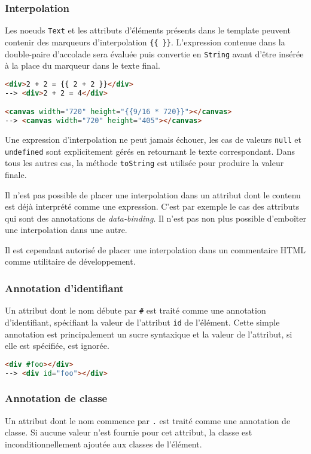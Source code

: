 \subsubsection{Interpolation}
Les noeuds \texttt{Text} et les attributs d'éléments présents dans le template peuvent contenir des marqueurs d'interpolation \texttt{\{\{ \}\}}. L'expression contenue dans la double-paire d'accolade sera évaluée puis convertie en \texttt{String} avant d'être insérée à la place du marqueur dans le texte final.

\begin{lstlisting}[language=HTML]
<div>2 + 2 = {{ 2 + 2 }}</div>
--> <div>2 + 2 = 4</div>

<canvas width="720" height="{{9/16 * 720}}"></canvas>
--> <canvas width="720" height="405"></canvas>
\end{lstlisting}

Une expression d'interpolation ne peut jamais échouer, les cas de valeurs \texttt{null} et \texttt{undefined} sont explicitement gérés en retournant le texte correspondant. Dans tous les autres cas, la méthode \texttt{toString} est utilisée pour produire la valeur finale.

Il n'est pas possible de placer une interpolation dans un attribut dont le contenu est déjà interprété comme une expression. C'est par exemple le cas des attributs qui sont des annotations de \emph{data-binding}. Il n'est pas non plus possible d'emboîter une interpolation dans une autre.

Il est cependant autorisé de placer une interpolation dans un commentaire HTML comme utilitaire de développement.

\subsubsection{Annotation d'identifiant}
Un attribut dont le nom débute par \texttt{\#} est traité comme une annotation d'identifiant, spécifiant la valeur de l'attribut \texttt{id} de l'élément. Cette simple annotation est principalement un sucre syntaxique et la valeur de l'attribut, si elle est spécifiée, est ignorée.

\begin{lstlisting}[language=HTML]
<div #foo></div>
--> <div id="foo"></div>
\end{lstlisting}

\subsubsection{Annotation de classe}
Un attribut dont le nom commence par \texttt{.} est traité comme une annotation de classe. Si aucune valeur n'est fournie pour cet attribut, la classe est inconditionnellement ajoutée aux classes de l'élément.

